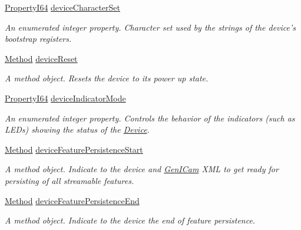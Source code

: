 \begin{DoxyCompactItemize}
\hyperlink{group___common_interface_ga81749b2696755513663492664a18a893}{Property\+I64} \hyperlink{classmv_i_m_p_a_c_t_1_1acquire_1_1_gen_i_cam_1_1_device_control_a1a10f20106cff74b1a9e27bcdf0ce722}{device\+Character\+Set}
\begin{DoxyCompactList}\small\item\em An enumerated integer property. Character set used by the strings of the device's bootstrap registers. \end{DoxyCompactList}\item 
\hyperlink{classmv_i_m_p_a_c_t_1_1acquire_1_1_method}{Method} \hyperlink{classmv_i_m_p_a_c_t_1_1acquire_1_1_gen_i_cam_1_1_device_control_a21e184091123a7e595203dc108555817}{device\+Reset}
\begin{DoxyCompactList}\small\item\em A method object. Resets the device to its power up state. \end{DoxyCompactList}\item 
\hyperlink{group___common_interface_ga81749b2696755513663492664a18a893}{Property\+I64} \hyperlink{classmv_i_m_p_a_c_t_1_1acquire_1_1_gen_i_cam_1_1_device_control_a62fc0ade07d7b47422b41314eba5d064}{device\+Indicator\+Mode}
\begin{DoxyCompactList}\small\item\em An enumerated integer property. Controls the behavior of the indicators (such as L\+E\+Ds) showing the status of the \hyperlink{classmv_i_m_p_a_c_t_1_1acquire_1_1_device}{Device}. \end{DoxyCompactList}\item 
\hyperlink{classmv_i_m_p_a_c_t_1_1acquire_1_1_method}{Method} \hyperlink{classmv_i_m_p_a_c_t_1_1acquire_1_1_gen_i_cam_1_1_device_control_a63d1e4f414c44a8accb0cd5f06708866}{device\+Feature\+Persistence\+Start}
\begin{DoxyCompactList}\small\item\em A method object. Indicate to the device and \hyperlink{namespacemv_i_m_p_a_c_t_1_1acquire_1_1_gen_i_cam}{Gen\+I\+Cam} X\+M\+L to get ready for persisting of all streamable features. \end{DoxyCompactList}\item 
\hyperlink{classmv_i_m_p_a_c_t_1_1acquire_1_1_method}{Method} \hyperlink{classmv_i_m_p_a_c_t_1_1acquire_1_1_gen_i_cam_1_1_device_control_a537e7e4f92ab052ef3b309a2151da1d5}{device\+Feature\+Persistence\+End}
\begin{DoxyCompactList}\small\item\em A method object. Indicate to the device the end of feature persistence. \end{DoxyCompactList}\item 

\end{DoxyCompactItemize}
